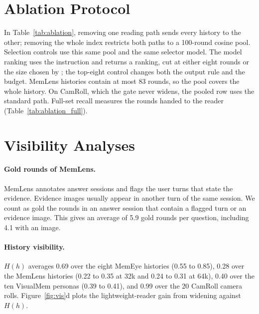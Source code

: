 

\section{Ablation Protocol}
\label{app:dev}

In Table~\ref{tab:ablation}, removing one reading path sends every history to the other; removing the whole index restricts both paths to a 100-round cosine pool. Selection controls use this same pool and the same selector model. The model ranking uses the \qss{} instruction and returns a ranking, cut at either eight rounds or the size chosen by \qss{}; the top-eight control changes both the output rule and the budget. MemLens histories contain at most 83 rounds, so the pool covers the whole history. On CamRoll, which the gate never widens, the pooled row uses the standard path. Full-set recall measures the rounds handed to the reader (Table~\ref{tab:ablation_full}).



\section{Visibility Analyses}
\label{app:vis}

\paragraph{Gold rounds of MemLens.} MemLens annotates answer sessions and flags the user turns that state the evidence. Evidence images usually appear in another turn of the same session. We count as gold the rounds in an answer session that contain a flagged turn or an evidence image. This gives an average of 5.9 gold rounds per question, including 4.1 with an image.

\paragraph{History visibility.} $H(h)$ averages 0.69 over the eight MemEye histories (0.55 to 0.85), 0.28 over the MemLens histories (0.22 to 0.35 at 32k and 0.24 to 0.31 at 64k), 0.40 over the ten VisualMem personas (0.39 to 0.41), and 0.99 over the 20 CamRoll camera rolls. Figure~\ref{fig:vis}d plots the lightweight-reader gain from widening against $H(h)$.

